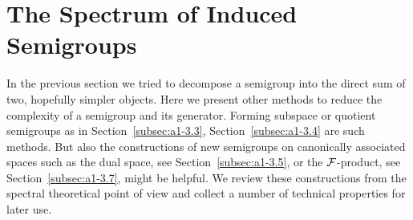 
\section{The Spectrum of Induced Semigroups}\label{sec:a3-4}
In the previous section we tried to decompose a semigroup into the direct sum of two, hopefully simpler objects.
Here we present other methods to reduce the complexity of a semigroup and its generator.
Forming subspace or quotient semigroups as in Section~\ref{subsec:a1-3.3}, Section~\ref{subsec:a1-3.4} are such methods.
But also the constructions of new semigroups on canonically associated spaces such as the dual space, see Section~\ref{subsec:a1-3.5}, or the $\mathcal{F}$-product, see Section~\ref{subsec:a1-3.7}, might be helpful.
We review these constructions from the spectral theoretical point of view and collect a number of technical properties for later use.

